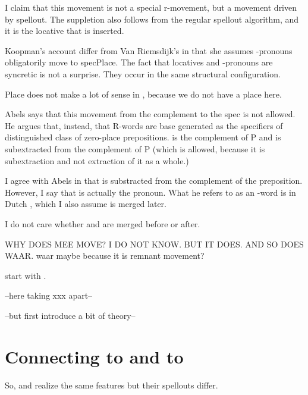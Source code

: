 \documentclass{article}
\begin{document}
I claim that this movement is not a special r-movement, but a movement driven by spellout. The suppletion also follows from the regular spellout algorithm, and it is the locative that is inserted.


Koopman's account differ from Van Riemsdijk's in that she assumes -pronouns obligatorily move to specPlace. The fact that locatives and -pronouns are syncretic is not a surprise. They occur in the same structural configuration.

Place does not make a lot of sense in , because we do not have a place here.

Abels says that this movement from the complement to the spec is not allowed. He argues that, instead, that R-words are base generated as the specifiers of distinguished class of zero-place prepositions.  is the complement of P and is subextracted from the complement of P (which is allowed, because it is subextraction and not extraction of it as a whole.)

I agree with Abels in that  is substracted from the complement of the preposition. However, I say that  is actually the pronoun. What he refers to as an -word is in Dutch , which I also assume is merged later.




I do not care whether  and  are merged before or after.

WHY DOES MEE MOVE? I DO NOT KNOW.
BUT IT DOES.
AND SO DOES WAAR.
waar maybe because it is remnant movement?




start with .


--here taking xxx apart--

--but first introduce a bit of theory--
















\section{Connecting  to  and  to }

So,  and  realize the same features but their spellouts differ.
\end{document}
